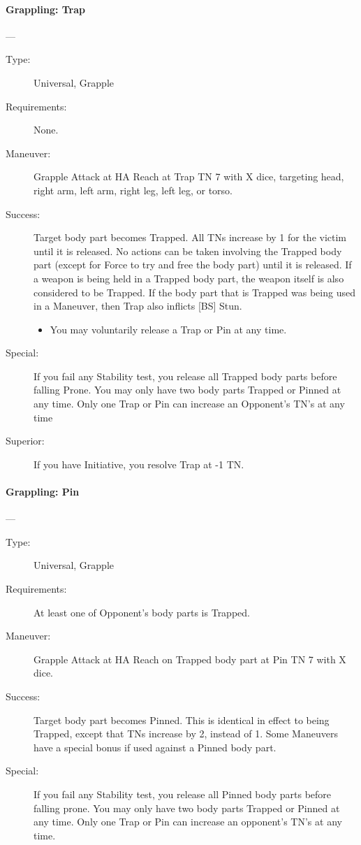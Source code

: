 \paragraph{ Grappling: Trap \large } \label{man:grappling-trap}
---\quad {\large [X]}
\vspace{-10pt} \begin{description}
\item [Type:] Universal, Grapple
\item [Requirements:] None.
\item [Maneuver:] Grapple Attack at HA Reach at Trap TN 7 with X dice, targeting
  head, right arm, left arm, right leg, left leg, or torso.

\item [Success:] Target body part becomes Trapped. All TNs increase by 1 for the
  victim until it is released. No actions can be taken involving the Trapped
  body part (except for Force to try and free the body part) until it is
  released. If a weapon is being held in a Trapped body part, the weapon itself
  is also considered to be Trapped. If the body part that is Trapped was being
  used in a Maneuver, then Trap also inflicts [BS] Stun.
\begin{itemize}
\item You may voluntarily release a Trap or Pin at any time.
\end{itemize}
\item [Special:] If you fail any Stability test, you release all Trapped body
  parts before falling Prone. You may only have two body parts Trapped or Pinned
  at any time. Only one Trap or Pin can increase an Opponent’s TN’s at any time

\item [ Superior: ] If you have Initiative, you resolve Trap at -1 TN.
\end{description}

\paragraph{Grappling: Pin \large } \label{man:grappling-pin}
---\quad {\large [X+2]}
\vspace{-10pt} \begin{description}
\item [Type:] Universal, Grapple
\item [Requirements:] At least one of Opponent's body parts is Trapped.
\item [Maneuver:] Grapple Attack at HA Reach on Trapped body part at Pin TN 7 with X dice.
\item [Success:] Target body part becomes Pinned. This is identical in effect to
  being Trapped, except that TNs increase by 2, instead of 1. Some Maneuvers
  have a special bonus if used against a Pinned body part.  
\item [Special:] If you fail any Stability test, you release all Pinned body parts
before falling prone. You may only have two body parts Trapped or Pinned at any
time. Only one Trap or Pin can increase an opponent’s TN’s at any time. 
\end{description}

